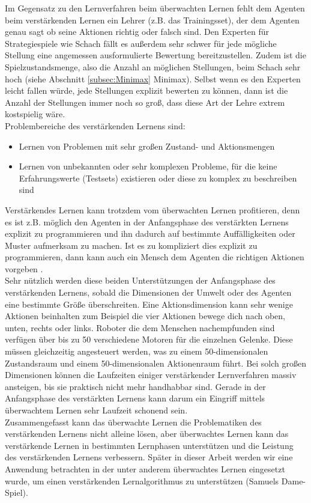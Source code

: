 Im Gegensatz zu den Lernverfahren beim überwachten Lernen fehlt dem Agenten beim verstärkenden Lernen ein Lehrer (z.B. das Trainingsset), der dem Agenten genau sagt ob seine Aktionen richtig oder falsch sind. Den Experten für Strategiespiele wie Schach fällt es außerdem sehr schwer für jede mögliche Stellung eine angemessen ausformulierte Bewertung bereitzustellen. Zudem ist die Spielzustandsmenge, also die Anzahl an möglichen Stellungen, beim Schach sehr hoch (siehe Abschnitt \ref{subsec:Minimax} Minimax). Selbst wenn es den Experten leicht fallen würde, jede Stellungen explizit bewerten zu können, dann ist die Anzahl der Stellungen immer noch so groß, dass diese Art der Lehre extrem kostspielig wäre. \\

Problembereiche des verstärkenden Lernens sind:
\begin{itemize}
\item Lernen von Problemen mit sehr großen Zustand- und Aktionsmengen
\item Lernen von unbekannten oder sehr komplexen Probleme, für die keine Erfahrungswerte (Testsets) existieren oder diese zu komplex zu beschreiben sind 
\end{itemize}

Verstärkendes Lernen kann trotzdem vom überwachten Lernen profitieren, denn es ist z.B. möglich den Agenten in der Anfangsphase des verstärkten Lernens explizit zu programmieren und ihn dadurch auf bestimmte Auffälligkeiten oder Muster aufmerksam zu machen. Ist es zu kompliziert dies explizit zu programmieren, dann kann auch ein Mensch dem Agenten die richtigen Aktionen vorgeben \cite[306]{Ertel}. \\

Sehr nützlich werden diese beiden Unterstützungen der Anfangsphase des verstärkenden Lernens, sobald die Dimensionen der Umwelt oder des Agenten eine bestimmte Größe überschreiten. Eine Aktionsdimension kann sehr wenige Aktionen beinhalten zum Beispiel die vier Aktionen bewege dich nach oben, unten, rechts oder links. Roboter die dem Menschen nachempfunden sind verfügen über bis zu 50 verschiedene Motoren für die einzelnen Gelenke. Diese müssen gleichzeitig angesteuert werden, was zu einem 50-dimensionalen Zustandsraum und einem 50-dimensionalen Aktionenraum führt\cite[\acs{vgl.} 305\psq]{Ertel}. Bei solch großen Dimensionen können die Laufzeiten einiger verstärkender Lernverfahren massiv ansteigen, bis sie praktisch nicht mehr handhabbar sind. Gerade in der Anfangsphase des verstärkten Lernens kann darum ein Eingriff mittels überwachtem Lernen sehr Laufzeit schonend sein. \\

Zusammengefasst kann das überwachte Lernen die Problematiken des verstärkenden Lernens nicht alleine lösen, aber überwachtes Lernen kann das verstärkende Lernen in bestimmten Lernphasen unterstützen und die Leistung des verstärkenden Lernens verbessern. Später in dieser Arbeit werden wir eine Anwendung betrachten in der unter anderem überwachtes Lernen eingesetzt wurde, um einen verstärkenden Lernalgorithmus zu unterstützen (Samuels Dame-Spiel).